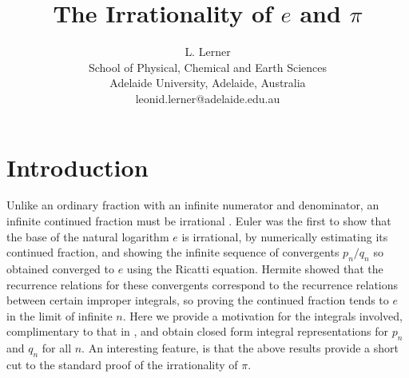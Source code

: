 \documentclass{article}
\theoremstyle{theorem}
\theoremstyle{definition}
\begin{document}
	
	
\title{The Irrationality of $e$ and $\pi$}
	
\author{L. Lerner\\     %
\scriptsize School of Physical, Chemical and Earth Sciences\\           %
Adelaide University, Adelaide, Australia\\                       %
leonid.lerner@adelaide.edu.au}                            
	
\maketitle



\section{Introduction}

Unlike an ordinary fraction with an infinite numerator and denominator, an infinite continued fraction must be irrational \cite{stein}. Euler \cite{euler} was the first to show that the base of the natural logarithm $e$ is irrational, by numerically estimating its continued fraction, and showing the infinite sequence of convergents $p_n/q_n$ so obtained converged to $e$ using the Ricatti equation. Hermite \cite{hermite} showed that the recurrence relations for these convergents correspond to the recurrence relations between certain improper integrals, so proving the continued fraction tends to $e$ in the limit of infinite $n$. Here we provide a motivation for the integrals involved, complimentary to that in \cite{cohn}, and obtain closed form integral representations for $p_n$ and $q_n$ for all $n$. An interesting feature, is that the above results provide a short cut to the standard proof of the irrationality of $\pi$.
\end{document}
